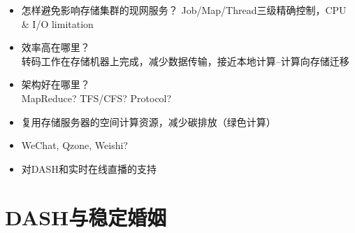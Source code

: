 \documentclass{beamer}
\begin{document}
\begin{frame}
\begin{itemize}
\item 怎样避免影响存储集群的现网服务？
Job/Map/Thread三级精确控制，CPU \& I/O limitation\\
\item 效率高在哪里？\\
转码工作在存储机器上完成，减少数据传输，接近本地计算--计算向存储迁移
\item 架构好在哪里？\\
MapReduce? TFS/CFS? Protocol? 
\item 复用存储服务器的空间计算资源，减少碳排放（绿色计算）
\item WeChat, Qzone, Weishi? 
\item 对DASH和实时在线直播的支持
\end{itemize}
\end{frame}

\section{DASH与稳定婚姻}
\end{document}
